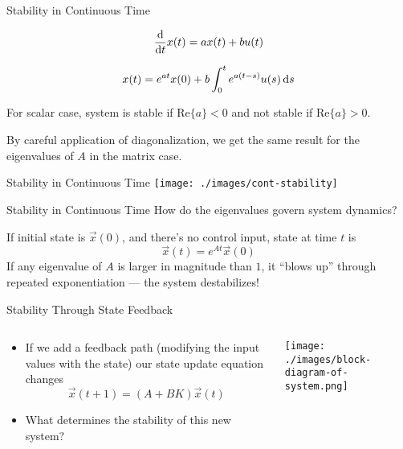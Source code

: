 \begin{frame}{Stability in Continuous Time}

    \[
        \ddt{} x(t) = a x(t) + b u(t)
    \]

    \[
        x(t) = e^{at} x(0) + b \int_0^t e^{a(t - s)} u(s) \,\differential s
    \]

    For scalar case, system is stable if \(\mathrm{Re}\{a\} < 0\) and not stable if \(\mathrm{Re}\{a\} > 0\).

    By careful application of diagonalization, we get the same result for the eigenvalues of \(A\) in the matrix case. 

\end{frame}

\begin{frame}{Stability in Continuous Time}
    \texttt{[image: ./images/cont-stability]}
\end{frame}

\begin{frame}{Stability in Continuous Time}
How do the eigenvalues govern system dynamics?

    If initial state is \(\vec x(0)\), and there's no control input, state at time \(t\) is
    \[
        \vec x(t) = e^{At} \vec x(0)
    \]
    If any eigenvalue of \(A\) is larger in magnitude than \(1\), it ``blows up'' through repeated exponentiation --- the system destabilizes!
\end{frame}


\begin{frame}{Stability Through State Feedback}

\begin{columns}[T] %
\begin{column}{.48\textwidth}
%
    \begin{itemize}
        \item If we add a feedback path (modifying the input values with the state) our state update equation changes \[ \vec x(t + 1) = (A + BK) \vec x(t)\]
        \item What determines the stability of this new system?
    \end{itemize}

\end{column}%
\hfill%
\begin{column}{.48\textwidth}
    \texttt{[image: ./images/block-diagram-of-system.png]}

\end{column}%
\end{columns}

\end{frame}


